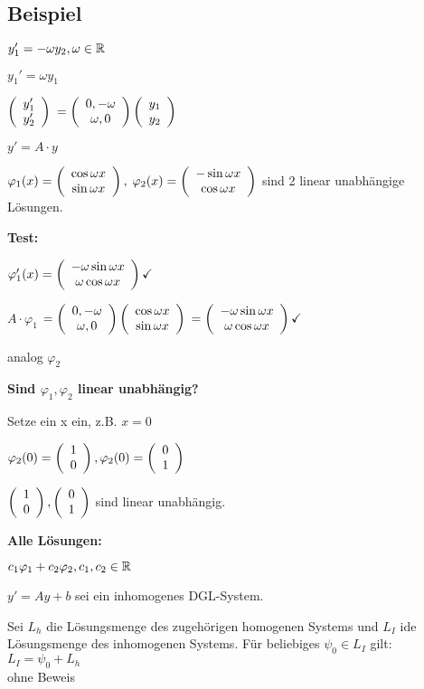 \subsection{Beispiel}
$ y_1' = -\omega y_2, \omega \in \mathbb{R}$

$ y_1' = \omega y_1$

$  \left(  \begin{array}{c} y_1'\\y_2' \end{array}  \right)  $
$=  \left(  \begin{array}{c} 0, -\omega\\\omega,0 \end{array}  \right)     \left(  \begin{array}{c} y_1\\y_2 \end{array}  \right)  $

$y' = A\cdot y$

$\varphi_1(x) =   \left(  \begin{array}{c} \cos \omega x\\\sin \omega x \end{array}  \right)  ,$
$\varphi_2(x) =   \left(  \begin{array}{c} -\sin \omega x\\\cos \omega x \end{array}  \right)  $ sind 2 linear unabhängige Lösungen.

\textbf{Test:} 

$\varphi_1'(x) =   \left(  \begin{array}{c} -\omega \sin \omega x\\\omega \cos \omega x \end{array}  \right)   \checkmark$

$A \cdot \varphi_1 $
$=  \left(  \begin{array}{c} 0, -\omega\\\omega,0 \end{array}  \right)     \left(  \begin{array}{c} \cos \omega x\\\sin \omega x \end{array}  \right)   $
$=  \left(  \begin{array}{c} -\omega \sin \omega x\\\omega \cos \omega x \end{array}  \right)   \checkmark$

analog $\varphi_2$

\textbf{Sind $\varphi_1, \varphi_2$ linear unabhängig?}

Setze ein x ein, z.B. $x=0$

$\varphi_2(0) =   \left(  \begin{array}{c} 1\\0 \end{array}  \right)  , \varphi_2(0) =   \left(  \begin{array}{c} 0\\1 \end{array}  \right)  $

$  \left(  \begin{array}{c} 1\\0 \end{array}  \right)  ,   \left(  \begin{array}{c} 0\\1 \end{array}  \right)  $ sind linear unabhängig. 

\textbf{Alle Lösungen: }

$c_1 \varphi_1 + c_2 \varphi_2, c_1, c_2 \in \mathbb{R}$

\begin{satz}
$y' = Ay+b$ sei ein inhomogenes DGL-System. 

Sei $L_h$ die Lösungsmenge des zugehörigen homogenen Systems und $L_I$ ide Lösungsmenge des inhomogenen Systems. 
Für beliebiges $\psi_0 \in L_I$ gilt: $L_I = \psi_0 + L_h$\\

ohne Beweis
\end{satz}

